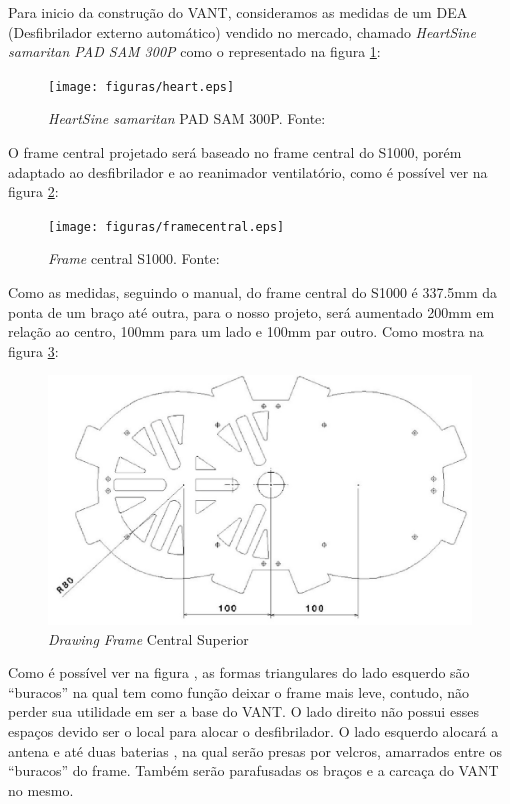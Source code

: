 Para inicio da construção do VANT, consideramos as medidas de um DEA (Desfibrilador externo automático) vendido no mercado, chamado \textit{HeartSine samaritan PAD SAM 300P}  como o representado na figura \ref{fig:heart}:

\begin{figure}[H]
    \centering
      \texttt{[image: figuras/heart.eps]}
    \caption{ \textit{HeartSine samaritan} PAD SAM 300P. Fonte: \cite{aedsingapore}}
    \label{fig:heart}
\end{figure}

O frame central projetado será baseado no frame central do S1000, porém adaptado ao desfibrilador e ao reanimador ventilatório, como é possível 
ver na figura \ref{fig:framecentral}: 

\begin{figure}[H]
    \centering
      \texttt{[image: figuras/framecentral.eps]}
    \caption{ \textit{Frame} central S1000. Fonte: \cite{heliguy}}
    \label{fig:framecentral}
\end{figure}


Como as medidas, seguindo o manual, do frame central do S1000 é 337.5mm da ponta de um braço até outra, para o nosso projeto, será aumentado  200mm em relação ao centro, 100mm para um lado e 100mm par outro. Como mostra na figura \ref{fig:drawing}:

\begin{figure}[H]
    \centering
      \includegraphics[keepaspectratio=true,scale=0.5]{figuras/drawing.eps}
    \caption{ \textit{Drawing Frame} Central Superior}
    \label{fig:drawing}
\end{figure}

Como é possível ver na figura \label{fig:drawinfinfo}, as formas triangulares do lado esquerdo são “buracos” na qual tem como função deixar o frame mais leve, contudo, não perder sua utilidade em ser a base do VANT. O lado direito não possui esses espaços devido ser o local para alocar o desfibrilador. O lado esquerdo alocará a antena e até duas baterias , na qual serão presas por velcros, amarrados entre os “buracos” do frame. Também serão parafusadas os braços e a carcaça do VANT no mesmo.

